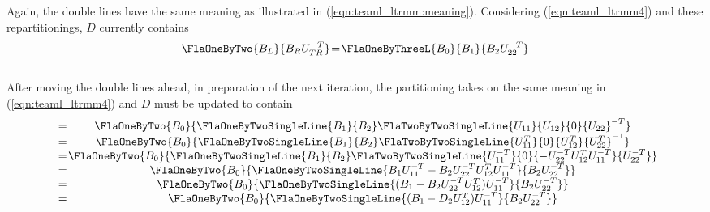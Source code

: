 Again, the double lines have the same meaning as illustrated
in (\ref{eqn:teaml_ltrmm:meaning}). Considering (\ref{eqn:teaml_ltrmm4}) and these repartitionings,
$ D $ currently contains
\begin{eqnarray*}
\begin{array}{c @{\hspace{1pt}} c @{\hspace{1pt}} c} 
\FlaOneByTwo{ B_{L} }
            { B_R U_{TR}^{-T} }
&=& 
\FlaOneByThreeL{ B_{0} }
               { B_{1} }
	       { B_{2} U_{22}^{-T} } \\      
\end{array}
\end{eqnarray*}
\\
After moving the double lines ahead, in preparation
of the next iteration, the partitioning takes on the same
meaning in (\ref{eqn:teaml_ltrmm4}) and $ D $ must be updated to contain 
\begin{eqnarray*}
\begin{array}{c @{\hspace{1pt}} c @{\hspace{1pt}} c @{\hspace{1pt}} c @{\hspace{1pt}} c}
&=& 
\FlaOneByTwo { 
	       B_{0} }
             { 
               \FlaOneByTwoSingleLine { B_{1}  } { B_{2}  }
	       \FlaTwoByTwoSingleLine { U_{11} } { U_{12} }
                                      {    0   } { U_{22} }^{-T}
              } \\
&=& 
\FlaOneByTwo { 
	       B_{0} }
             { 
               \FlaOneByTwoSingleLine { B_{1}  } { B_{2}  }
	       \FlaTwoByTwoSingleLine { U_{11}^{T} } {     0      }
                                      { U_{12}^{T} } { U_{22}^{T} }^{-1}
              } \\
&=& 
\FlaOneByTwo { 
	       B_{0} }
             { 
               \FlaOneByTwoSingleLine { B_{1}       } { B_{2} }
	       \FlaTwoByTwoSingleLine { U_{11}^{-T} } {     0      }
                                      { -U_{22}^{-T} U_{12}^{T} U_{11}^{-T} } { U_{22}^{-T}}
              } \\
&=&
\FlaOneByTwo { 
	       B_{0} }
             { 
               \FlaOneByTwoSingleLine { B_{1} U_{11}^{-T} - B_{2} U_{22}^{-T} U_{12}^{T} U_{11}^{-T} } { B_{2} U_{22}^{-T} }
              } \\
&=&
\FlaOneByTwo { 
	       B_{0} }
             { 
               \FlaOneByTwoSingleLine { ( B_{1} - B_{2} U_{22}^{-T} U_{12}^{T} ) U_{11}^{-T} } { B_{2} U_{22}^{-T} }
              } \\
&=&
\FlaOneByTwo { 
	       B_{0} }
             { 
               \FlaOneByTwoSingleLine { ( B_{1} - D_{2} U_{12}^{T} ) U_{11}^{-T} } { B_{2} U_{22}^{-T} }
              } \\
\end{array}
\end{eqnarray*}
